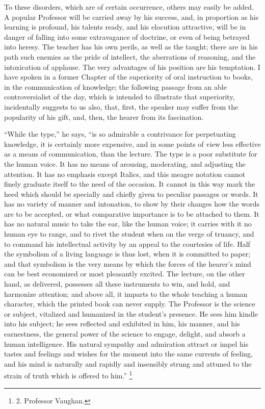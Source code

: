 To these disorders, which are
of certain occurrence, others may easily be added. A popular Professor
will be carried away by his success, and, in proportion as his
learning is profound, his talents ready, and his elocution attractive,
will be in danger of falling into some extravagance of doctrine, or
even of being betrayed into heresy. The teacher has his own perils, as
well as the taught; there are in his path such enemies as the pride of
intellect, the aberrations of reasoning, and the intoxication of
applause. The very advantages of his position are his temptation. I
have spoken in a former Chapter of the superiority of oral instruction
to books, in the communication of knowledge; the following passage
from an able controversialist of the day, which is intended to
illustrate that superiority, incidentally suggests to us also, that,
first, the speaker may suffer from the popularity of his gift, and,
then, the hearer from its fascination.

``While the type,'' he says,
``is so admirable a contrivance for perpetuating knowledge, it is
certainly more expensive, and in some points of view less effective as
a means of communication, than the lecture. The type is a poor
substitute for the human voice. It has no means of arousing,
moderating, and adjusting the attention. It has no emphasis except
Italics, and this meagre notation cannot finely graduate itself to the
need of the occasion. It cannot in this way mark the heed which should
be specially and chiefly given to peculiar passages or words. It has
no variety of manner and intonation, to show by their changes how the
words are to be accepted, or what comparative importance is to be
attached to them. It has no natural music to take the ear, like the
human voice; it carries with it no human eye to range, and to rivet
the student when on the verge of truancy, and to command his
intellectual activity by an appeal to the courtesies of life. Half the
symbolism of a living language is thus lost, when it is committed to
paper; and that symbolism is the very means by which the forces of the
hearer's mind can be best economized or most pleasantly excited. The
lecture, on the other hand, as delivered, possesses all these
instruments to win, and hold, and harmonize attention; and above all,
it imparts to the whole teaching a human character, which the printed
book can never supply. The Professor is the science or subject,
vitalized and humanized in the student's presence. He sees him kindle
into his subject; he sees reflected and exhibited in him, his manner,
and his earnestness, the general power of the science to engage,
delight, and absorb a human intelligence. His natural sympathy and
admiration attract or impel his tastes and feelings and wishes for the
moment into the same currents of feeling, and his mind is naturally
and rapidly and insensibly strung and attuned to the strain of
truth which is offered to him.'' \footnote{2.
Professor Vaughan.}

